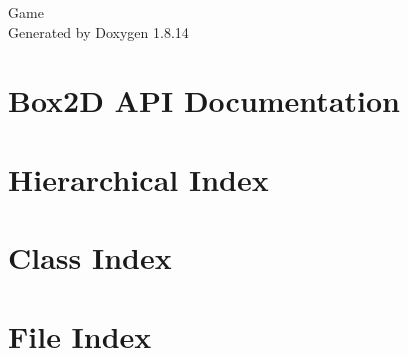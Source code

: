 \documentclass[twoside]{book}
\newcommand{\+}{\discretionary{\mbox{\scriptsize$\hookleftarrow$}}{}{}}
\newcommand{\clearemptydoublepage}{%
  \newpage{\pagestyle{empty}\cleardoublepage}%
}
\begin{document}
\hypersetup{pageanchor=false,
             bookmarksnumbered=true,
             pdfencoding=unicode
            }
\begin{titlepage}
\vspace*{7cm}
\begin{center}%
{\Large Game }\\
\vspace*{1cm}
{\large Generated by Doxygen 1.8.14}\\
\end{center}
\end{titlepage}
\clearemptydoublepage
{}
\tableofcontents
\clearemptydoublepage
{}
\hypersetup{pageanchor=true}

\chapter{Box2D A\+PI Documentation}
\label{index}\hypertarget{index}{}
\chapter{Hierarchical Index}

\chapter{Class Index}

\chapter{File Index}

\end{document}
